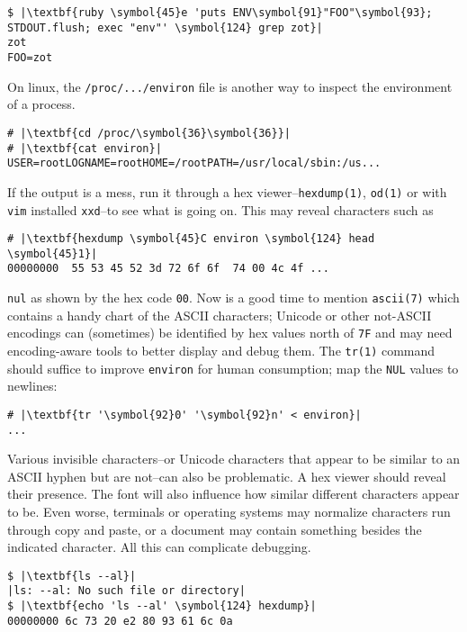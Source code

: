\documentclass[10pt,a4paper]{article}
\begin{document}
\begin{lstlisting}
$ |\textbf{ruby \symbol{45}e 'puts ENV\symbol{91}"FOO"\symbol{93}; STDOUT.flush; exec "env"' \symbol{124} grep zot}|
zot
FOO=zot
\end{lstlisting}

On linux, the \texttt{/proc/.../environ} file is another way to inspect
the environment of a process.

\begin{lstlisting}
# |\textbf{cd /proc/\symbol{36}\symbol{36}}|
# |\textbf{cat environ}|
USER=rootLOGNAME=rootHOME=/rootPATH=/usr/local/sbin:/us...
\end{lstlisting}

If the output is a mess, run it through a hex
viewer--\texttt{hexdump(1)}, \texttt{od(1)} or with \texttt{vim}
installed \texttt{xxd}--to see what is going on. This may reveal
characters such as

\begin{lstlisting}
# |\textbf{hexdump \symbol{45}C environ \symbol{124} head \symbol{45}1}|
00000000  55 53 45 52 3d 72 6f 6f  74 00 4c 4f ...
\end{lstlisting}

\texttt{nul} as shown by the hex code \texttt{00}. Now is a good time to
mention \texttt{ascii(7)} which contains a handy chart of the ASCII
characters; Unicode or other not-ASCII encodings can (sometimes) be
identified by hex values north of \texttt{7F} and may need
encoding-aware tools to better display and debug them. The
\texttt{tr(1)} command should suffice to improve \texttt{environ} for
human consumption; map the \texttt{NUL} values to newlines:

\begin{lstlisting}
# |\textbf{tr '\symbol{92}0' '\symbol{92}n' < environ}|
...
\end{lstlisting}

Various invisible characters--or Unicode characters that appear to be
similar to an ASCII hyphen but are not--can also be problematic. A hex
viewer should reveal their presence. The font will also influence how
similar different characters appear to be. Even worse, terminals or
operating systems may normalize characters run through copy and paste,
or a document may contain something besides the indicated character. All
this can complicate debugging.

\begin{lstlisting}
$ |\textbf{ls --al}|
|ls: --al: No such file or directory|
$ |\textbf{echo 'ls --al' \symbol{124} hexdump}|
00000000 6c 73 20 e2 80 93 61 6c 0a
\end{lstlisting}
\end{document}
